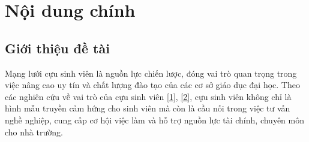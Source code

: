 \documentclass[12pt,a4paper]{article}
\begin{document}
\pagestyle{fancy}
\fancyhf{}
\fancyfoot[C]{\thepage}
\renewcommand{\headrulewidth}{0pt}
\renewcommand{\footrulewidth}{0pt}

\section{Nội dung chính}
\vspace{-6pt}

\subsection{Giới thiệu đề tài}
\vspace{-4pt}
Mạng lưới cựu sinh viên là nguồn lực chiến lược, đóng vai trò quan trọng trong việc nâng cao uy tín và chất lượng đào tạo của các cơ sở giáo dục đại học. Theo các nghiên cứu về vai trò của cựu sinh viên \hyperref[ref:obeng]{[1]}, \hyperref[ref:unisel]{[2]}, cựu sinh viên không chỉ là hình mẫu truyền cảm hứng cho sinh viên mà còn là cầu nối trong việc tư vấn nghề nghiệp, cung cấp cơ hội việc làm và hỗ trợ nguồn lực tài chính, chuyên môn cho nhà trường.
\end{document}

